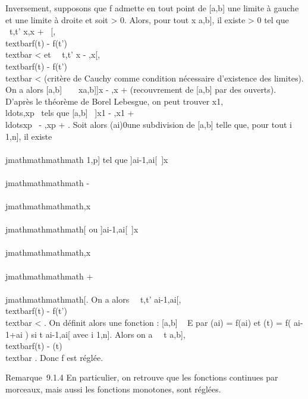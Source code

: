Inversement, supposons que f admette en tout point de {[}a,b{]} une
limite à gauche et une limite à droite et soit \epsilon \textgreater{} 0.
Alors, pour tout x \in {[}a,b{]}, il existe \etax \textgreater{} 0
tel que \forall~t,t' \in{]}x,x + \etax~{[},
\\textbar{}f(t) - f(t')\\textbar{}
\textless{} \epsilon et \forall~~t,t' \in{]}x -
\etax,x{[}, \\textbar{}f(t) -
f(t')\\textbar{} \textless{} \epsilon (critère de Cauchy comme
condition nécessaire d'existence des limites). On a alors {[}a,b{]}
\subset~\⋃ ~
x\in{[}a,b{]}{]}x - \etax,x + \etax{[} (recouvrement
de {[}a,b{]} par des ouverts). D'après le théorème de Borel Lebesgue, on
peut trouver
x1,\\ldots,xp~
tels que {[}a,b{]} \subset~{]}x1 -
,x1 +
\etax1{[}\cup\\ldots\cup{]}xp~
- \etaxp,xp + \etaxp{[}.
Soit alors (ai)0\leqi\leqn une subdivision de {[}a,b{]}
telle que, pour tout i \in {[}1,n{]}, il existe \\\\jmathmathmathmath \in {[}1,p{]} tel que
{]}ai-1,ai{[}\subset~{]}x\\\\jmathmathmathmath -
\etax\\\\jmathmathmathmath,x\\\\jmathmathmathmath{[} ou
{]}ai-1,ai{[}\subset~{]}x\\\\jmathmathmathmath,x\\\\jmathmathmathmath +
\etax\\\\jmathmathmathmath{[}. On a alors \forall~~t,t'
\in{]}ai-1,ai{[}, \\textbar{}f(t) -
f(t')\\textbar{} \textless{} \epsilon. On définit alors une
fonction \phi : {[}a,b{]} \rightarrow~ E par \phi(ai) = f(ai) et \phi(t)
= f( ai-1+ai  ) si t
\in{]}ai-1,ai{[} avec i \in {[}1,n{]}. Alors on a
\forall~~t \in {[}a,b{]}, \\textbar{}f(t)
- \phi(t)\\textbar{} \leq \epsilon. Donc f est réglée.

Remarque~9.1.4 En particulier, on retrouve que les fonctions continues
par morceaux, mais aussi les fonctions monotones, sont réglées.

